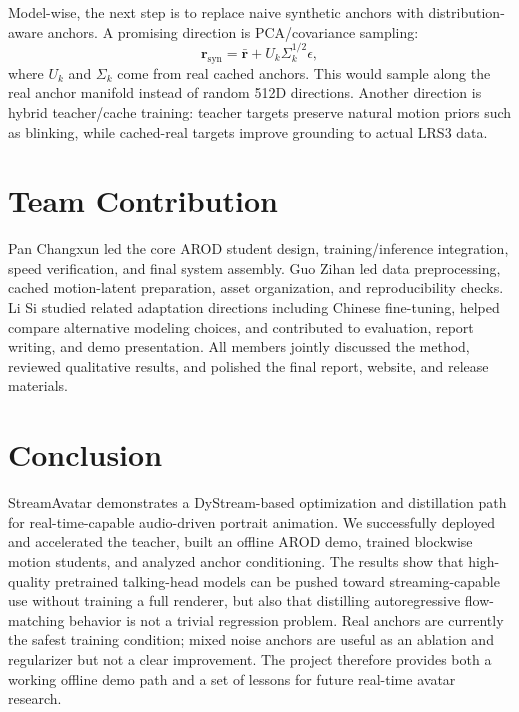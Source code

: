 \documentclass{article}
\begin{document}
Model-wise, the next step is to replace naive synthetic anchors with distribution-aware anchors. A promising direction is PCA/covariance sampling:
\begin{equation}
    \mathbf{r}_{\text{syn}} =
    \bar{\mathbf{r}} +
    U_k \Sigma_k^{1/2} \epsilon,
\end{equation}
where $U_k$ and $\Sigma_k$ come from real cached anchors. This would sample along the real anchor manifold instead of random 512D directions. Another direction is hybrid teacher/cache training: teacher targets preserve natural motion priors such as blinking, while cached-real targets improve grounding to actual LRS3 data.

\section{Team Contribution}

Pan Changxun led the core AROD student design, training/inference integration, speed verification, and final system assembly. Guo Zihan led data preprocessing, cached motion-latent preparation, asset organization, and reproducibility checks. Li Si studied related adaptation directions including Chinese fine-tuning, helped compare alternative modeling choices, and contributed to evaluation, report writing, and demo presentation. All members jointly discussed the method, reviewed qualitative results, and polished the final report, website, and release materials.

\section{Conclusion}

StreamAvatar demonstrates a DyStream-based optimization and distillation path for real-time-capable audio-driven portrait animation. We successfully deployed and accelerated the teacher, built an offline AROD demo, trained blockwise motion students, and analyzed anchor conditioning. The results show that high-quality pretrained talking-head models can be pushed toward streaming-capable use without training a full renderer, but also that distilling autoregressive flow-matching behavior is not a trivial regression problem. Real anchors are currently the safest training condition; mixed noise anchors are useful as an ablation and regularizer but not a clear improvement. The project therefore provides both a working offline demo path and a set of lessons for future real-time avatar research.



\end{document}
